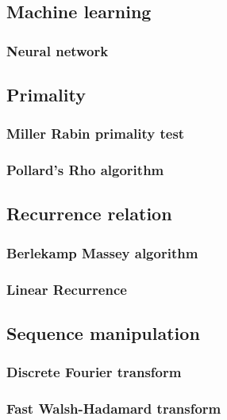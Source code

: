 \documentclass[titlepage,a4paper,10pt]{article}
\begin{document}
\begin{multicols}{2}
\begin{spacing}{0.8}
{			\subsection{Machine learning}
				\subsubsection{Neural network}
					
			\subsection{Primality}
				\subsubsection{Miller Rabin primality test}
					
				\subsubsection{Pollard's Rho algorithm}
					
			\subsection{Recurrence relation}
				\subsubsection{Berlekamp Massey algorithm}
					
				\subsubsection{Linear Recurrence}
					
			\subsection{Sequence manipulation}
				\subsubsection{Discrete Fourier transform}
					
				\subsubsection{Fast Walsh-Hadamard transform}
					
}
\end{spacing}
\end{multicols}
\end{document}
